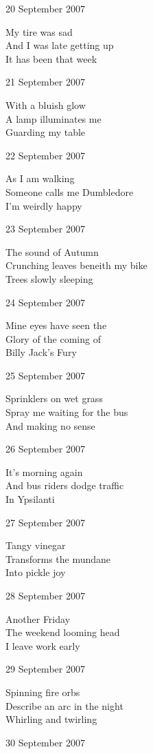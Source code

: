 \documentclass[12pt]{article}
\begin{document}
20 September 2007

My tire was sad \\
And I was late getting up \\
It has been that week

21 September 2007

With a bluish glow \\
A lamp illuminates me \\
Guarding my table

22 September 2007

As I am walking \\
Someone calls me Dumbledore \\
I'm weirdly happy

23 September 2007

The sound of Autumn \\
Crunching leaves beneith my bike \\
Trees slowly sleeping


\newpage

24 September 2007

Mine eyes have seen the \\
Glory of the coming of \\
Billy Jack's Fury

25 September 2007

Sprinklers on wet grass \\
Spray me waiting for the bus \\
And making no sense

26 September 2007

It's morning again \\
And bus riders dodge traffic \\
In Ypsilanti

27 September 2007

Tangy vinegar \\
Transforms the mundane \\
Into pickle joy

28 September 2007

Another Friday \\
The weekend looming head \\
I leave work early

29 September 2007

Spinning fire orbs \\
Describe an arc in the night \\
Whirling and twirling

30 September 2007
\end{document}
